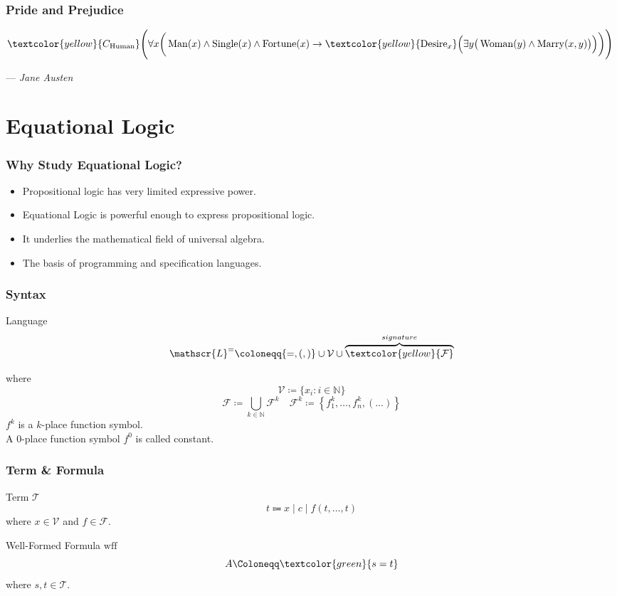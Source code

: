 \documentclass[UTF8,11pt,colorlinks,compress,openany]{beamer}%
\begin{document}
\begin{frame}\frametitle{Pride and Prejudice}
$\textcolor{yellow}{C_{\operatorname{Human}}}\Bigg(\forall x\bigg(\operatorname{Man}(x)\wedge \operatorname{Single}(x)\wedge \operatorname{Fortune}(x) \to \textcolor{yellow}{\operatorname{Desire}_x}\Big(\exists y\big(\operatorname{Woman}(y)\wedge \operatorname{Marry}(x,y)\big)\Big)\bigg)\Bigg)$\par\hfill --- \textsl{Jane Austen}
\end{frame}


\section{Equational Logic}


\begin{frame}\frametitle{Why Study Equational Logic?}
	\begin{itemize}
		\item Propositional logic has very limited expressive power.
		\item Equational Logic is powerful enough to express propositional logic.
		\item It underlies the mathematical field of universal algebra.
		\item The basis of programming and specification languages.
	\end{itemize}
\end{frame}

\begin{frame}\frametitle{Syntax}
	\begin{block}{Language}
		\[\mathscr{L}^=\coloneqq \{=,(,)\}\cup\mathcal{V}\cup\overbrace{\textcolor{yellow}{\mathcal{F}}}^{signature}\]
	\end{block}
	where
	\[\mathcal{V}\coloneqq \{x_i: i\in\mathbb{N}\}\]
	\[\mathcal{F}\coloneqq \bigcup\limits_{k\in\mathbb{N}}\mathcal{F}^k\quad \mathcal{F}^k\coloneqq \left\{f_1^k,\dots,f_n^k,(\dots)\right\}\]
	$f^k$ is a $k$-place function symbol.\\
	A $0$-place function symbol $f^0$ is called constant.
\end{frame}

\begin{frame}\frametitle{Term \& Formula}
	\begin{block}{Term $\mathcal{T}$}
		\[t\Coloneqq x\mid c\mid f(t,\dots,t)\]
		where $x\in\mathcal{V}$ and $f\in\mathcal{F}$.
	\end{block}
	\begin{block}{Well-Formed Formula $\mathrm{wff}$}
		\[A\Coloneqq \textcolor{green}{s=t}\]
		where $s,t\in\mathcal{T}$.
	\end{block}
\end{frame}
\end{document}
